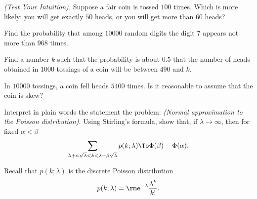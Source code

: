 \begin{problem}[Handout 14, \# 10]
  \emph{(Test Your Intuition).} Suppose a fair coin is tossed \(100\)
  times. Which is more likely: you will get exactly \(50\) heads, or you
  will get more than \(60\) heads?
\end{problem}
\begin{solution}

\end{solution}
\newpage

\begin{problem}[Handout 14, \# 11]
  Find the probability that among \(\num{10000}\) random digits the digit
  \(7\) appears not more than \(968\) times.
\end{problem}
\begin{solution}

\end{solution}
\newpage

\begin{problem}[Handout 14, \# 12]
  Find a number \(k\) such that the probability is about \(0.5\) that the
  number of heads obtained in \(\num{1000}\) tossings of a coin will be
  between \(490\) and \(k\).
\end{problem}
\begin{solution}

\end{solution}
\newpage

\begin{problem}[Handout 14, \# 13]
  In \(\num{10000}\) tossings, a coin fell heads \(\num{5400}\) times. Is
  it reasonable to assume that the coin is skew?
\end{problem}
\begin{solution}

\end{solution}
\newpage

\begin{problem}[Handout 14, \# 14]
  Interpret in plain words the statement the problem: \emph{(Normal
    approximation to the Poisson distribution).} Using Stirling's formula,
  show that, if \(\lambda\to\infty\), then for fixed \(\alpha<\beta\)
  \[
    \sum_{\lambda+\alpha\sqrt{\lambda}<k<\lambda+\beta\sqrt{\lambda}}p(k;\lambda)
    \To \Phi(\beta)-\Phi(\alpha).
  \]
\end{problem}
\begin{solution}
  Recall that \(p(k;\lambda)\) is the discrete Poisson distribution
  \[
    p(k;\lambda)=\rme^{-\lambda}\frac{\lambda^k}{k!}.
  \]
\end{solution}
\newpage

